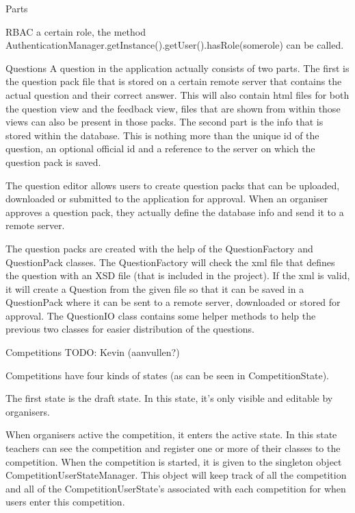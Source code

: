 \documentclass[]{article}
\begin{document}
\begin{section}{Parts}
\begin{subsection}{RBAC}
        a certain role, the method AuthenticationManager.getInstance().getUser().hasRole(somerole)
        can be called.
    \end{subsection}
    \begin{subsection}{Questions}
        A question in the application actually consists of two parts.
        The first is the question pack file that is stored on a certain remote server
        that contains the actual question and their correct answer. This will also contain
        html files for both the question view and the feedback view, files that are shown
        from within those views can also be present in those packs.
        The second part is the info that is stored within the database. This is nothing
        more than the unique id of the question, an optional official id and a reference
        to the server on which the question pack is saved.
        
        The question editor allows users to create question packs that can be uploaded, 
        downloaded or submitted to the application for approval. When an organiser approves
        a question pack, they actually define the database info and send it to a remote server.
        
        The question packs are created with the help of the QuestionFactory and
        QuestionPack classes. The QuestionFactory will check the xml file that defines
        the question with an XSD file (that is included in the project). If the xml is
        valid, it will create a Question from the given file so that it can be saved in
        a QuestionPack where it can be sent to a remote server, downloaded or stored
        for approval. The QuestionIO class contains some helper methods to help the
        previous two classes for easier distribution of the questions.
    \end{subsection}
    \begin{subsection}{Competitions}
        TODO: Kevin (aanvullen?)
    
        Competitions have four kinds of states (as can be seen in CompetitionState).
        
        The first state is the draft state. In this state, it's only visible and editable
        by organisers. 
        
        When organisers active the competition, it enters the active state. In this state
        teachers can see the competition and register one or more of their classes to the
        competition. When the competition is started, it is given to the singleton object
        CompetitionUserStateManager. This object will keep track of all the competition
        and all of the CompetitionUserState's associated with each competition for when
        users enter this competition.
        

\end{subsection}
\end{section}
\end{document}
